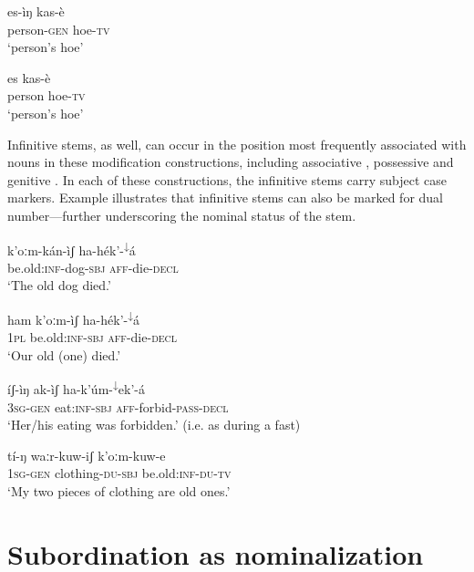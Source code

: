 \documentclass[output=paper]{langsci/langscibook}
\begin{document}
\ea\label{ex:mahland:27}
\gll es-\`{i}ŋ            kas-\`{e}   \\
person\textsc{{}-gen}   hoe\textsc{{}-tv}\\
\glt `person's hoe'
\z

\ea\label{ex:mahland:28}
\gll es         kas-\`{e}  \\
person   hoe\textsc{{}-tv}\\
\glt `person's hoe'
\z

Infinitive stems, as well, can occur in the position most frequently associated with nouns in these modification constructions, including associative , possessive  and genitive . In each of these constructions, the infinitive stems carry subject case markers. Example  illustrates that infinitive stems can also be marked for dual number—further underscoring the nominal status of the stem.  

\ea\label{ex:mahland:29}
\gll k'oːm-k\'{a}n-\`{i}ʃ           ha-h\'{e}k'-\textsuperscript{↓}\'{a}        \\
be.old:\textsc{inf}{}-dog-\textsc{sbj}   \textsc{aff}{}-die-\textsc{decl} \\
\glt `The old dog died.'
\z

\ea\label{ex:mahland:30}
\gll ham    k'oːm-\`{i}ʃ           ha-h\'{e}k'-\textsuperscript{↓}\'{a}      \\
\textsc{1pl}     be.old:\textsc{inf-sbj}  \textsc{aff}{}-die-\textsc{decl} \\
\glt `Our old (one) died.' 
\z

\ea\label{ex:mahland:31}
\gll \'{i}ʃ-\`{i}ŋ          ak-\`{i}ʃ            ha-k'\'{u}m-\textsuperscript{↓}ek'-\'{a}  \\
\textsc{3sg-gen}    eat:\textsc{inf-sbj}   \textsc{aff}{}-forbid-\textsc{pass-decl}\\
\glt `Her/his eating was forbidden.'  (i.e. as during a fast)
\z

\ea\label{ex:mahland:32}
\gll t\'{i}-ŋ            waːr-kuw-iʃ         k'oːm-kuw-e   \\
\textsc{1sg-gen}   clothing-\textsc{du-sbj}   be.old:\textsc{inf-du-tv}\\
\glt `My two pieces of clothing are old ones.'
\z

\section{Subordination as nominalization}\label{sec:mahland:2}
\end{document}
